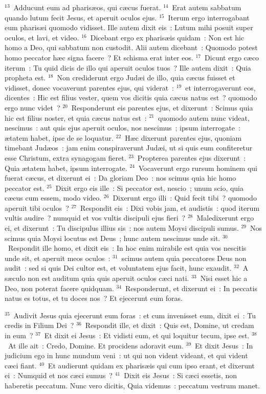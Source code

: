${}^{13}$~Adducunt eum ad pharis\ae os, qui c\ae cus fuerat.
${}^{14}$~Erat autem sabbatum quando lutum fecit Jesus, et aperuit oculos ejus.
${}^{15}$~Iterum ergo interrogabant eum pharis\ae i quomodo vidisset. Ille autem dixit eis~: Lutum mihi posuit super oculos, et lavi, et video.
${}^{16}$~Dicebant ergo ex pharis\ae is quidam~: Non est hic homo a Deo, qui sabbatum non custodit. Alii autem dicebant~: Quomodo potest homo peccator h\ae c signa facere~? Et schisma erat inter eos.
${}^{17}$~Dicunt ergo c\ae co iterum~: Tu quid dicis de illo qui aperuit oculos tuos~? Ille autem dixit~: Quia propheta est.
${}^{18}$~Non crediderunt ergo Jud\ae i de illo, quia c\ae cus fuisset et vidisset, donec vocaverunt parentes ejus, qui viderat~:
${}^{19}$~et interrogaverunt eos, dicentes~: Hic est filius vester, quem vos dicitis quia c\ae cus natus est~? quomodo ergo nunc videt~?
${}^{20}$~Responderunt eis parentes ejus, et dixerunt~: Scimus quia hic est filius noster, et quia c\ae cus natus est~:
${}^{21}$~quomodo autem nunc videat, nescimus~: aut quis ejus aperuit oculos, nos nescimus~; ipsum interrogate~: \ae tatem habet, ipse de se loquatur.
${}^{22}$~H\ae c dixerunt parentes ejus, quoniam timebant Jud\ae os~: jam enim conspiraverunt Jud\ae i, ut si quis eum confiteretur esse Christum, extra synagogam fieret.
${}^{23}$~Propterea parentes ejus dixerunt~: Quia \ae tatem habet, ipsum interrogate.
${}^{24}$~Vocaverunt ergo rursum hominem qui fuerat c\ae cus, et dixerunt ei~: Da gloriam Deo~: nos scimus quia hic homo peccator est.
${}^{25}$~Dixit ergo eis ille~: Si peccator est, nescio~; unum scio, quia c\ae cus cum essem, modo video.
${}^{26}$~Dixerunt ergo illi~: Quid fecit tibi~? quomodo aperuit tibi oculos~?
${}^{27}$~Respondit eis~: Dixi vobis jam, et audistis~: quod iterum vultis audire~? numquid et vos vultis discipuli ejus fieri~?
${}^{28}$~Maledixerunt ergo ei, et dixerunt~: Tu discipulus illius sis~: nos autem Moysi discipuli sumus.
${}^{29}$~Nos scimus quia Moysi locutus est Deus~; hunc autem nescimus unde sit.
${}^{30}$~Respondit ille homo, et dixit eis~: In hoc enim mirabile est quia vos nescitis unde sit, et aperuit meos oculos~:
${}^{31}$~scimus autem quia peccatores Deus non audit~: sed si quis Dei cultor est, et voluntatem ejus facit, hunc exaudit.
${}^{32}$~A s\ae culo non est auditum quia quis aperuit oculos c\ae ci nati.
${}^{33}$~Nisi esset hic a Deo, non poterat facere quidquam.
${}^{34}$~Responderunt, et dixerunt ei~: In peccatis natus es totus, et tu doces nos~? Et ejecerunt eum foras.


${}^{35}$~Audivit Jesus quia ejecerunt eum foras~: et cum invenisset eum, dixit ei~: Tu credis in Filium Dei~?
${}^{36}$~Respondit ille, et dixit~: Quis est, Domine, ut credam in eum~?
${}^{37}$~Et dixit ei Jesus~: Et vidisti eum, et qui loquitur tecum, ipse est.
${}^{38}$~At ille ait~: Credo, Domine. Et procidens adoravit eum.
${}^{39}$~Et dixit Jesus~: In judicium ego in hunc mundum veni~: ut qui non vident videant, et qui vident c\ae ci fiant.
${}^{40}$~Et audierunt quidam ex pharis\ae is qui cum ipso erant, et dixerunt ei~: Numquid et nos c\ae ci sumus~?
${}^{41}$~Dixit eis Jesus~: Si c\ae ci essetis, non haberetis peccatum. Nunc vero dicitis, Quia videmus~: peccatum vestrum manet.

